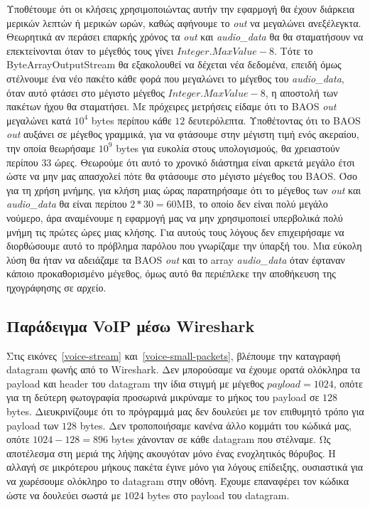 \documentclass{article}
\begin{document}
Υποθέτουμε ότι οι κλήσεις χρησιμοποιώντας 
αυτήν την εφαρμογή θα έχουν διάρκεια μερικών λεπτών ή μερικών ωρών, καθώς αφήνουμε το \textit{out} να μεγαλώνει 
ανεξέλεγκτα. Θεωρητικά αν περάσει επαρκής χρόνος τα \textit{out} και \textit{audio\_data} θα 
θα σταματήσουν να επεκτείνονται όταν το μέγεθός τους γίνει $Integer.MaxValue - 8$. Τότε το ByteArrayOutputStream θα 
εξακολουθεί να δέχεται νέα δεδομένα, επειδή όμως
στέλνουμε ένα νέο πακέτο κάθε φορά που μεγαλώνει το μέγεθος του \textit{audio\_data}, όταν αυτό φτάσει 
στο μέγιστο μέγεθος $Integer.MaxValue - 8$, η αποστολή των πακέτων ήχου θα σταματήσει. Με πρόχειρες 
μετρήσεις είδαμε ότι το BAOS \textit{out} μεγαλώνει κατά $10^4$ bytes περίπου κάθε $12$ δευτερόλεπτα. 
Υποθέτοντας ότι το BAOS \textit{out} αυξάνει σε μέγεθος γραμμικά, για να φτάσουμε στην μέγιστη τιμή ενός ακεραίου, 
την οποία θεωρήσαμε $10^9$ bytes για ευκολία στους υπολογισμούς, θα χρειαστούν περίπου $33$ ώρες. Θεωρούμε
ότι αυτό το χρονικό διάστημα είναι αρκετά μεγάλο έτσι ώστε να μην μας απασχολεί πότε θα φτάσουμε στο μέγιστο 
μέγεθος του BAOS. Όσο για τη χρήση μνήμης,
για κλήση μιας ώρας παρατηρήσαμε ότι το μέγεθος των \textit{out} και \textit{audio\_data} θα είναι περίπου $2 * 30 = 60$MB,
το οποίο δεν είναι πολύ μεγάλο νούμερο, άρα αναμένουμε η εφαρμογή μας να μην χρησιμοποιεί υπερβολικά πολύ
μνήμη τις πρώτες ώρες μιας κλήσης. Για αυτούς τους λόγους δεν επιχειρήσαμε να διορθώσουμε αυτό το πρόβλημα
παρόλου που γνωρίζαμε την ύπαρξή του. Μια εύκολη λύση θα ήταν να αδειάζαμε τα BAOS \textit{out} και το array
\textit{audio\_data} όταν έφταναν κάποιο προκαθορισμένο μέγεθος, όμως αυτό θα περιέπλεκε την αποθήκευση 
της ηχογράφησης σε αρχείο.


\subsection{Παράδειγμα VoIP μέσω Wireshark}
Στις εικόνες~\ref{voice-stream} και~\ref{voice-small-packets}, βλέπουμε την καταγραφή datagram φωνής από το Wireshark.
Δεν μπορούσαμε να έχουμε ορατά ολόκληρα τα payload και header του datagram την ίδια στιγμή με μέγεθος $payload = 1024$,
οπότε για τη δεύτερη φωτογραφία προσωρινά μικρύναμε το μήκος του payload σε $128$ bytes. Διευκρινίζουμε ότι το 
πρόγραμμά μας δεν δουλεύει με τον επιθυμητό τρόπο για payload των $128$ bytes. Δεν τροποποιήσαμε κανένα
άλλο κομμάτι του κώδικά μας, οπότε $1024 - 128 = 896$ bytes χάνονταν σε κάθε datagram που στέλναμε.
Ως αποτέλεσμα στη μεριά της λήψης ακουγόταν μόνο ένας ενοχλητικός θόρυβος. Η αλλαγή σε μικρότερου μήκους πακέτα 
έγινε μόνο για λόγους επίδειξης, ουσιαστικά για να χωρέσουμε ολόκληρο το datagram στην οθόνη.
Έχουμε επαναφέρει τον κώδικα ώστε να δουλεύει σωστά με $1024$ bytes στο payload του datagram.
\end{document}
